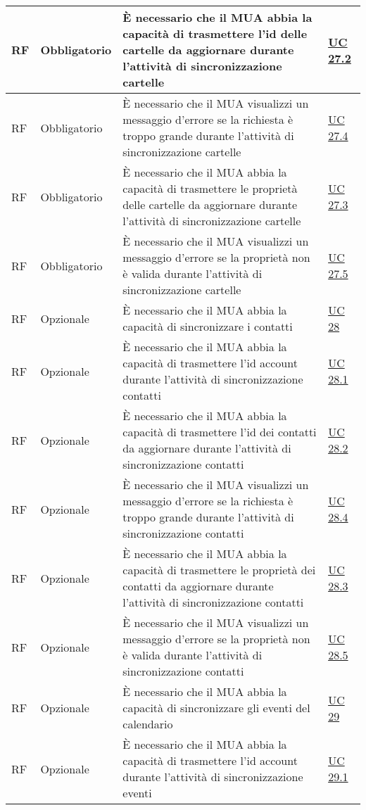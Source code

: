 \begin{longtable}{*{1}{>{\centering\arraybackslash}p{1.5cm}}*{1}{>{\centering\arraybackslash}p{2.5cm}}p{6cm}*{1}{>{\centering\arraybackslash}p{3cm}}}
    RF & Obbligatorio & È necessario che il MUA abbia la capacità di trasmettere l'id delle cartelle da aggiornare durante l'attività di sincronizzazione cartelle & \hyperref[sec:UC27.2]{UC 27.2}
    \\\hline
    RF & Obbligatorio & È necessario che il MUA visualizzi un messaggio d'errore se la richiesta è troppo grande durante l'attività di sincronizzazione cartelle & \hyperref[sec:UC27.4]{UC 27.4}
    \\\hline
    RF & Obbligatorio & È necessario che il MUA abbia la capacità di trasmettere le proprietà delle cartelle da aggiornare durante l'attività di sincronizzazione cartelle & \hyperref[sec:UC27.3]{UC 27.3}
    \\\hline
    RF & Obbligatorio & È necessario che il MUA visualizzi un messaggio d'errore se la proprietà non è valida durante l'attività di sincronizzazione cartelle & \hyperref[sec:UC27.5]{UC 27.5}
    \\\hline
    RF & Opzionale & È necessario che il MUA abbia la capacità di sincronizzare i contatti & \hyperref[sec:UC28]{UC 28}
    \\\hline
    RF & Opzionale & È necessario che il MUA abbia la capacità di trasmettere l'id account durante l'attività di sincronizzazione contatti & \hyperref[sec:UC28.1]{UC 28.1}
    \\\hline
    RF & Opzionale & È necessario che il MUA abbia la capacità di trasmettere l'id dei contatti da aggiornare durante l'attività di sincronizzazione contatti & \hyperref[sec:UC28.2]{UC 28.2}
    \\\hline
    RF & Opzionale & È necessario che il MUA visualizzi un messaggio d'errore se la richiesta è troppo grande durante l'attività di sincronizzazione contatti & \hyperref[sec:UC28.4]{UC 28.4}
    \\\hline
    RF & Opzionale & È necessario che il MUA abbia la capacità di trasmettere le proprietà dei contatti da aggiornare durante l'attività di sincronizzazione contatti & \hyperref[sec:UC28.3]{UC 28.3}
    \\\hline
    RF & Opzionale & È necessario che il MUA visualizzi un messaggio d'errore se la proprietà non è valida durante l'attività di sincronizzazione contatti & \hyperref[sec:UC28.5]{UC 28.5}
    \\\hline
    RF & Opzionale & È necessario che il MUA abbia la capacità di sincronizzare gli eventi del calendario & \hyperref[sec:UC29]{UC 29}
    \\\hline
    RF & Opzionale & È necessario che il MUA abbia la capacità di trasmettere l'id account durante l'attività di sincronizzazione eventi & \hyperref[sec:UC29.1]{UC 29.1}

\end{longtable}
